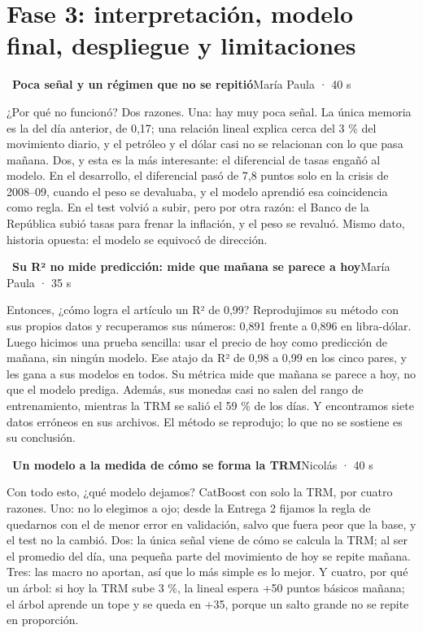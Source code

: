 \documentclass[11pt,letterpaper]{article}
\newcommand{\diapo}[4]{\par\bigskip{\color{oro}\textbf{#1.}}~\textbf{#2}\hfill{\small #3 · #4}\par\nopagebreak\smallskip}
\begin{document}
\section*{Fase 3: interpretación, modelo final, despliegue y limitaciones}
\diapo{11}{Poca señal y un régimen que no se repitió}{María Paula}{40 s}
¿Por qué no funcionó? Dos razones. Una: hay muy poca señal. La única memoria es la del día anterior, de 0,17; una relación lineal explica cerca del 3 \% del movimiento diario, y el petróleo y el dólar casi no se relacionan con lo que pasa mañana. Dos, y esta es la más interesante: el diferencial de tasas engañó al modelo. En el desarrollo, el diferencial pasó de 7,8 puntos solo en la crisis de 2008–09, cuando el peso se devaluaba, y el modelo aprendió esa coincidencia como regla. En el test volvió a subir, pero por otra razón: el Banco de la República subió tasas para frenar la inflación, y el peso se revaluó. Mismo dato, historia opuesta: el modelo se equivocó de dirección.

\diapo{12}{Su R² no mide predicción: mide que mañana se parece a hoy}{María Paula}{35 s}
Entonces, ¿cómo logra el artículo un R² de 0,99? Reprodujimos su método con sus propios datos y recuperamos sus números: 0,891 frente a 0,896 en libra-dólar. Luego hicimos una prueba sencilla: usar el precio de hoy como predicción de mañana, sin ningún modelo. Ese atajo da R² de 0,98 a 0,99 en los cinco pares, y les gana a sus modelos en todos. Su métrica mide que mañana se parece a hoy, no que el modelo prediga. Además, sus monedas casi no salen del rango de entrenamiento, mientras la TRM se salió el 59 \% de los días. Y encontramos siete datos erróneos en sus archivos. El método se reprodujo; lo que no se sostiene es su conclusión.

\diapo{13}{Un modelo a la medida de cómo se forma la TRM}{Nicolás}{40 s}
Con todo esto, ¿qué modelo dejamos? CatBoost con solo la TRM, por cuatro razones. Uno: no lo elegimos a ojo; desde la Entrega 2 fijamos la regla de quedarnos con el de menor error en validación, salvo que fuera peor que la base, y el test no la cambió. Dos: la única señal viene de cómo se calcula la TRM; al ser el promedio del día, una pequeña parte del movimiento de hoy se repite mañana. Tres: las macro no aportan, así que lo más simple es lo mejor. Y cuatro, por qué un árbol: si hoy la TRM sube 3 \%, la lineal espera +50 puntos básicos mañana; el árbol aprende un tope y se queda en +35, porque un salto grande no se repite en proporción.
\par{}
\par{}
\end{document}

